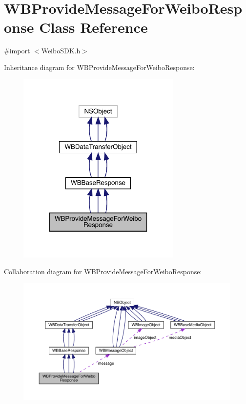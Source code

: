 \hypertarget{interface_w_b_provide_message_for_weibo_response}{}\section{W\+B\+Provide\+Message\+For\+Weibo\+Response Class Reference}
\label{interface_w_b_provide_message_for_weibo_response}


{\ttfamily \#import $<$Weibo\+S\+D\+K.\+h$>$}



Inheritance diagram for W\+B\+Provide\+Message\+For\+Weibo\+Response\+:\nopagebreak
\begin{figure}[H]
\begin{center}
\leavevmode
\includegraphics[width=230pt]{interface_w_b_provide_message_for_weibo_response__inherit__graph}
\end{center}
\end{figure}


Collaboration diagram for W\+B\+Provide\+Message\+For\+Weibo\+Response\+:\nopagebreak
\begin{figure}[H]
\begin{center}
\leavevmode
\includegraphics[width=350pt]{interface_w_b_provide_message_for_weibo_response__coll__graph}
\end{center}
\end{figure}
